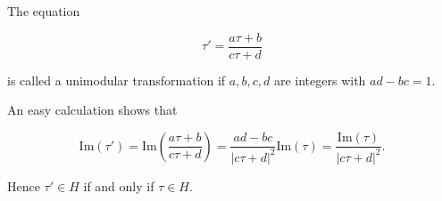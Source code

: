 The equation

$$\tau' = \frac{a\tau + b}{c\tau + d}$$

is called a unimodular transformation if $a, b, c, d$ are integers with $ad - bc = 1$.

An easy calculation shows that

$$\text{Im}(\tau') = \text{Im}\left(\frac{a\tau + b}{c\tau + d}\right) = \frac{ad - bc}{|c\tau + d|^2} \text{Im}(\tau) = \frac{\text{Im}(\tau)}{|c\tau + d|^2}.$$

Hence $\tau' \in H$ if and only if $\tau \in H$.

